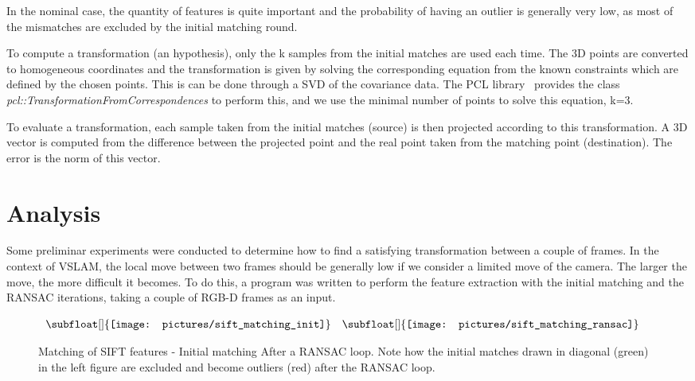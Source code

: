 In the nominal case, the quantity of features is quite important and the probability of having an outlier is generally very low, as most of the mismatches are excluded by the initial matching round.


To compute a transformation (an hypothesis), only the k samples from the initial matches are used each time. The 3D points are converted to homogeneous coordinates and the transformation is given by solving the corresponding equation from the known constraints which are defined by the chosen points. This is can be done through a \gls{SVD} of the covariance data. The \gls{PCL} library~\cite{Rusu_ICRA2011_PCL} provides the class \emph{pcl::TransformationFromCorrespondences} to perform this, and we use the minimal number of points to solve this equation, k=3.

To evaluate a transformation, each sample taken from the initial matches (source) is then projected according to this transformation. A 3D vector is computed from the difference between the projected point and the real point taken from the matching point (destination). The error is the norm of this vector.

\section{Analysis}

Some preliminar experiments were conducted to determine how to find a satisfying transformation between a couple of frames. In the context of \gls{VSLAM}, the local move between two frames should be generally low if we consider a limited move of the camera. The larger the move, the more difficult it becomes. To do this, a program was written to perform the feature extraction with the initial matching and the RANSAC iterations, taking a couple of RGB-D frames as an input.

\begin{figure}[H]
\centering$
 \begin{array}{cc}
 \subfloat[]{\label{fig:sift_match_1} \texttt{[image: pictures/sift\_matching\_init]}} &
 \subfloat[]{\label{fig:sift_match_2} \texttt{[image: pictures/sift\_matching\_ransac]}}
 \end{array}$
\caption{Matching of SIFT features - \protect{} Initial matching \protect{} After a RANSAC loop. Note how the initial matches drawn in diagonal (green) in the left figure are excluded and become outliers (red) after the RANSAC loop.}
\end{figure}


